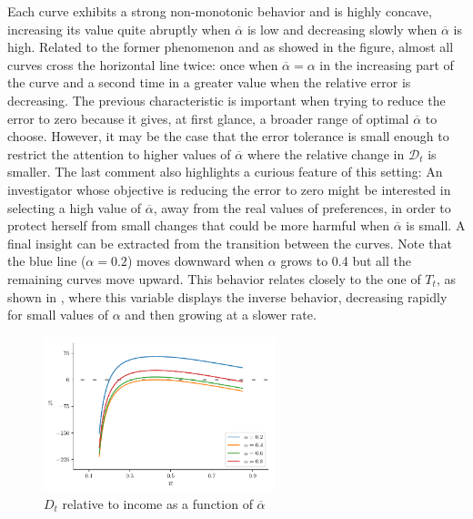 \documentclass[english, a4paper, 12pt]{article}
\begin{document}
Each curve exhibits a strong non-monotonic behavior and is highly concave, increasing its value quite abruptly when $\overline{\alpha}$ is low and decreasing slowly when $\overline{\alpha}$ is high. Related to the former phenomenon and as showed in the figure, almost all curves cross the horizontal line twice: once when $\overline{\alpha} = \alpha$ in the increasing part of the curve and a second time in a greater value when the relative error is decreasing. The previous characteristic is important when trying to reduce the error to zero because it gives, at first glance, a broader range of optimal $\overline{\alpha}$ to choose. However, it may be the case that the error tolerance is small enough to restrict the attention to higher values of $\overline{\alpha}$ where the relative change in $\mathcal{D}_{t}$ is smaller. The last comment also highlights a curious feature of this setting: An investigator whose objective is reducing the error to zero might be interested in selecting a high value of $\overline{\alpha}$, away from the real values of preferences, in order to protect herself from small changes that could be more harmful when $\overline{\alpha}$ is small. A final insight can be extracted from the transition between the curves. Note that the blue line ($\alpha = 0.2$) moves downward when $\alpha$ grows to 0.4 but all the remaining curves move upward. This behavior relates closely to the one of $T_{t}$, as shown in , where this variable displays the inverse behavior, decreasing rapidly for small values of $\alpha$ and then growing at a slower rate. 
	\begin{figure}
		\caption{$D_{t}$ relative to income as a function of $\overline{\alpha}$}
		\label{fig:monotDt}
		\includegraphics[width = 0.6\textwidth]{MonotonocityDt} \vspace{-1ex}
	\end{figure}
\end{document}
